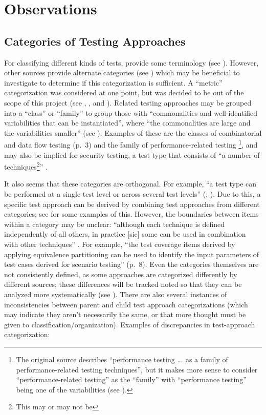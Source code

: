 \section{Observations}

\subsection{Categories of Testing Approaches}

For classifying different kinds of tests, \citet{IEEE2022} provide some
terminology (see ). However, other sources
\citep{BarbosaEtAl2006, SouzaEtAl2017} provide alternate
categories (see ) which may be beneficial to investigate to
determine if this categorization is sufficient. A ``metric'' categorization was
considered at one point, but was decided to be out of the scope of this project
(see , , and ).
Related testing approaches may be grouped into a ``class'' or ``family'' to
group those with ``commonalities and well-identified variabilities that can be
instantiated'', where ``the commonalities are large and the variabilities
smaller'' (see ). Examples of these are the classes of
combinatorial \citep[p.~15]{IEEE2021} and data flow testing (p.~3) and the
family of performance-related testing \cite[p.~1187]{Moghadam2019}\footnote{The
      original source describes ``performance testing \dots\ as a family of
      performance-related testing techniques'', but it makes more sense to
      consider ``performance-related testing'' as the ``family'' with
      ``performance testing'' being one of the variabilities
      (see ).}, and may also be implied for
security testing, a test type that consists of ``a number of
techniques\footnote{This may or may not be }''
\cite[p.~40]{IEEE2021}.

It also seems that these categories are orthogonal. For example, ``a test type
can be performed at a single test level or across several test levels''
(\citealp[p.~15]{IEEE2022}; \citeyear[p.~7]{IEEE2021}). Due to this, a specific
test approach can be derived by combining test approaches from different
categories; see  for some examples
of this. However, the boundaries between items within a category may be unclear:
``although each technique is defined independently of all others, in practice
      [sic] some can be used in combination with other techniques''
\citep[p.~8]{IEEE2021}. For example, ``the test coverage items derived by
applying equivalence partitioning can be used to identify the input parameters
of test cases derived for scenario testing'' (p.~8). Even the categories
themselves are not consistently defined, as some approaches are categorized
differently by different sources; these differences will be tracked noted so
that they can be analyzed more systematically (see ).
There are also several instances of inconsistencies between parent and child
test approach categorizations (which may indicate they aren't necessarily the
same, or that more thought must be given to classification/organization).
Examples of discrepancies in test-approach categorization:


